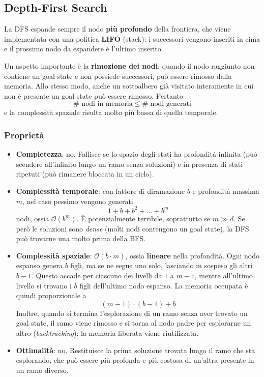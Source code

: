 \documentclass[a4paper, 11pt, oneside]{book}
\theoremstyle{definition}
\begin{document}
	\subsection{Depth-First Search}
	La DFS espande sempre il nodo \textbf{pi\`u profondo} della frontiera, che viene
	implementata con una politica \textbf{LIFO} (stack): i successori vengono inseriti in
	cima e il prossimo nodo da espandere \`e l'ultimo inserito.

	Un aspetto importante \`e la \textbf{rimozione dei nodi}: quando il nodo raggiunto non
	contiene un goal state e non possiede successori, pu\`o essere rimosso dalla memoria.
	Allo stesso modo, anche un sottoalbero gi\`a visitato interamente in cui non \`e presente
	un goal state pu\`o essere rimosso. Pertanto
	\[
		\#\text{ nodi in memoria} \leq \#\text{ nodi generati}
	\]
	e la complessit\`a spaziale risulta molto pi\`u bassa di quella temporale.

	\subsubsection*{Propriet\`a}
	\begin{itemize}
		\item \textbf{Completezza}: no. Fallisce se lo spazio degli stati ha profondit\`a
			infinita (pu\`o scendere all'infinito lungo un ramo senza soluzioni) e in presenza
			di stati ripetuti (pu\`o rimanere bloccata in un ciclo).

		\item \textbf{Complessit\`a temporale}: con fattore di diramazione $b$ e profondit\`a
			massima $m$, nel caso pessimo vengono generati
			\[
				1 + b + b^2 + \dots + b^m
			\]
			nodi, ossia $\mathcal{O}(b^m)$. \`E potenzialmente terribile, soprattutto se
			$m \gg d$. Se per\`o le soluzioni sono \emph{dense} (molti nodi contengono un goal
			state), la DFS pu\`o trovarne una molto prima della BFS.

		\item \textbf{Complessit\`a spaziale}: $\mathcal{O}(b \cdot m)$, ossia
			\textbf{lineare} nella profondit\`a. Ogni nodo espanso genera $b$ figli, ma se ne
			segue uno solo, lasciando in sospeso gli altri $b-1$. Questo accade per ciascuno
			dei livelli da $1$ a $m-1$, mentre all'ultimo livello si trovano i $b$
			figli dell'ultimo nodo espanso. La memoria occupata \`e quindi proporzionale a
			\[
				(m-1) \cdot (b-1) + b
			\]
			Inoltre, quando si termina l'esplorazione di un ramo senza aver trovato un goal
			state, il ramo viene rimosso e si torna al nodo padre per esplorarne un altro
			(\emph{backtracking}): la memoria liberata viene riutilizzata.

		\item \textbf{Ottimalit\`a}: no. Restituisce la prima soluzione trovata lungo il ramo
			che sta esplorando, che pu\`o essere pi\`u profonda e pi\`u costosa di un'altra
			presente in un ramo diverso.
	\end{itemize}
\end{document}
